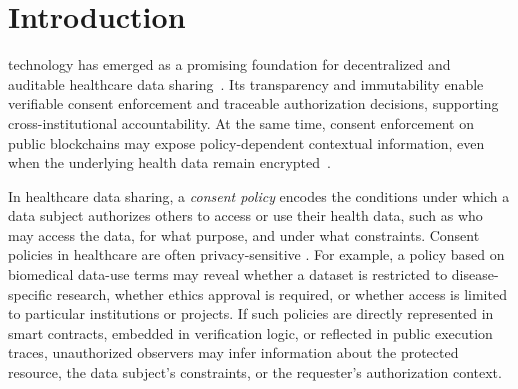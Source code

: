 \section{Introduction}
\label{sec:introduction}

 technology has emerged as a promising foundation for decentralized and auditable healthcare data sharing~\cite{kakarlapudi2021systematic, welzel2025enabling, li2024you}.
Its transparency and immutability enable verifiable consent enforcement and traceable authorization decisions, supporting cross-institutional accountability.
At the same time, consent enforcement on public blockchains may expose policy-dependent contextual information, even when the underlying health data remain encrypted~\cite{beres2021blockchain, li2025privacy}.

In healthcare data sharing, a \emph{consent policy} encodes the conditions under which a data subject authorizes others to access or use their health data, such as who may access the data, for what purpose, and under what constraints.
Consent policies in healthcare are often privacy-sensitive \cite{lawson2021data}.
For example, a policy based on biomedical data-use terms may reveal whether a dataset is restricted to disease-specific research, whether ethics approval is required, or whether access is limited to particular institutions or projects.
If such policies are directly represented in smart contracts, embedded in verification logic, or reflected in public execution traces, unauthorized observers may infer information about the protected resource, the data subject's constraints, or the requester's authorization context.

